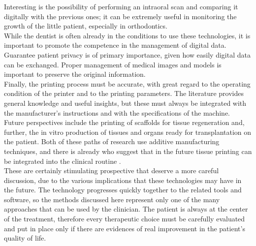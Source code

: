 Interesting is the possibility of performing an intraoral scan and comparing it digitally with the previous ones; it can be extremely useful in monitoring the growth of the little patient, especially in orthodontics. \\
While the dentist is often already in the conditions to use these technologies, it is important to promote the competence in the management of digital data. Guarantee patient privacy is of primary importance, given how easily digital data can be exchanged. Proper management of medical images and models is important to preserve the original information.\\ Finally, the printing process must be accurate, with great regard to the operating condition of the printer and to the printing parameters. The literature provides general knowledge and useful insights, but these must always be integrated with the manufacturer's instructions and with the specifications of the machine.\\
Future perspectives include the printing of scaffolds for tissue regeneration and, further, the in vitro production of tissues and organs ready for transplantation on the patient. Both of these paths of research use additive manufacturing techniques, and there is already who suggest that in the future tissue printing can be integrated into the clinical routine \parencite{Reference142}. \\
These are certainly stimulating prospective that deserve a more careful discussion, due to the various implications that these technologies may have in the future. The technology progresses quickly together to the related tools and software, so the methods discussed here represent only one of the many approaches that can be used by the clinician. The patient is always at the center of the treatment, therefore every therapeutic choice must be carefully evaluated and put in place only if there are evidences of real improvement in the patient's quality of life.

